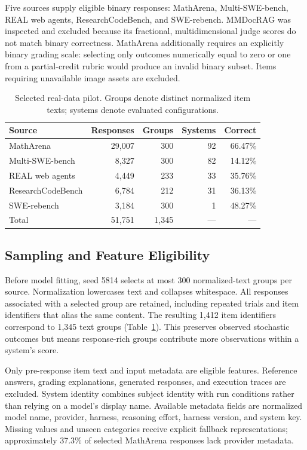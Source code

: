 \documentclass[conference]{IEEEtran}
\begin{document}
Five sources supply eligible binary responses: MathArena, Multi-SWE-bench, REAL web agents, ResearchCodeBench, and SWE-rebench. MMDocRAG was inspected and excluded because its fractional, multidimensional judge scores do not match binary correctness. MathArena additionally requires an explicitly binary grading scale: selecting only outcomes numerically equal to zero or one from a partial-credit rubric would produce an invalid binary subset. Items requiring unavailable image assets are excluded.

\begin{table}[t]
\caption{Selected real-data pilot. Groups denote distinct normalized item texts; systems denote evaluated configurations.}
\label{tab:data}\centering\small\setlength{\tabcolsep}{4pt}
\begin{tabular}{@{}lrrrr@{}}
\toprule
Source & Responses & Groups & Systems & Correct \\
\midrule
MathArena & 29,007 & 300 & 92 & 66.47\% \\
Multi-SWE-bench & 8,327 & 300 & 82 & 14.12\% \\
REAL web agents & 4,449 & 233 & 33 & 35.76\% \\
ResearchCodeBench & 6,784 & 212 & 31 & 36.13\% \\
SWE-rebench & 3,184 & 300 & 1 & 48.27\% \\
\midrule
Total & 51,751 & 1,345 & --- & --- \\
\bottomrule
\end{tabular}
\end{table}

\subsection{Sampling and Feature Eligibility}
Before model fitting, seed 5814 selects at most 300 normalized-text groups per source. Normalization lowercases text and collapses whitespace. All responses associated with a selected group are retained, including repeated trials and item identifiers that alias the same content. The resulting 1,412 item identifiers correspond to 1,345 text groups (Table~\ref{tab:data}). This preserves observed stochastic outcomes but means response-rich groups contribute more observations within a system's score.

Only pre-response item text and input metadata are eligible features. Reference answers, grading explanations, generated responses, and execution traces are excluded. System identity combines subject identity with run conditions rather than relying on a model's display name. Available metadata fields are normalized model name, provider, harness, reasoning effort, harness version, and system key. Missing values and unseen categories receive explicit fallback representations; approximately 37.3\% of selected MathArena responses lack provider metadata.
\end{document}
